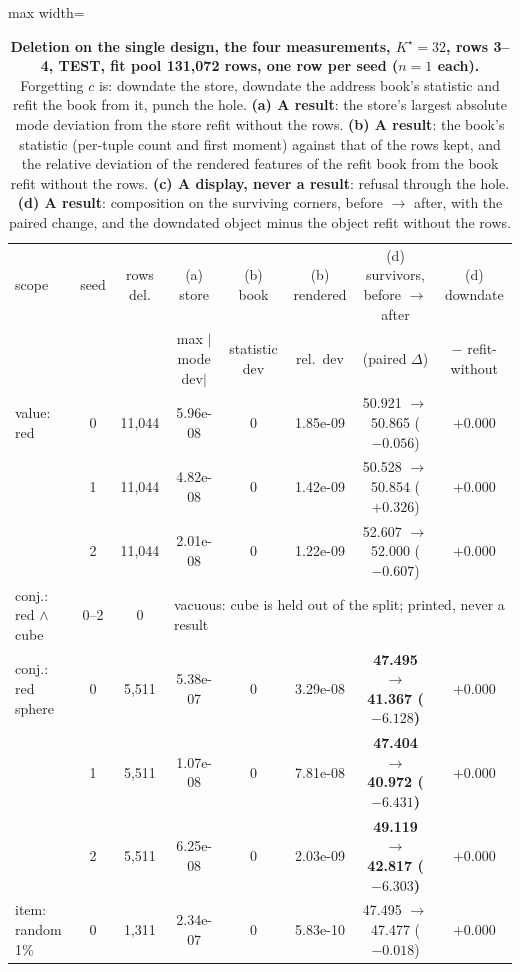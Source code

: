 \documentclass{article} %
\newcommand{\Kstar}{\ensuremath{K^{\star}}}
\begin{document}
\begin{table}[t]
\centering\small
\caption{\textbf{Deletion on the single design, the four measurements, $\Kstar=32$, rows 3--4, TEST, fit %
pool 131,072 rows, one row per seed ($n=1$ each).} Forgetting $c$ is: downdate the store, downdate %
the address book's statistic and refit the book from it, punch the hole. \textbf{(a) A result}: the
store's largest absolute mode deviation from the store refit without the rows. \textbf{(b) A
result}: the book's statistic (per-tuple count and first moment) against that of the rows kept, and
the relative deviation of the rendered features of the refit book from the book refit without the
rows. \textbf{(c) A display, never a result}: refusal through the hole. \textbf{(d) A result}:
composition on the surviving corners, before $\to$ after, with the paired change, and the downdated
object minus the object refit without the rows.}
\label{tab:del}
\setlength{\tabcolsep}{2.6pt}
\begin{adjustbox}{max width=\linewidth}\begin{tabular}{lccccccc}
\toprule
scope & seed & rows del. & (a) store & (b) book & (b) rendered & (d) survivors, before $\to$ after & (d) downdate \\
 & & & max $|$mode dev$|$ & statistic dev & rel.\ dev & (paired $\Delta$) & $-$ refit-without \\
\midrule
value: red & 0 & 11,044 & 5.96e-08 & 0 & 1.85e-09 & 50.921 $\to$ 50.865 ($-0.056$) & $+0.000$ \\
 & 1 & 11,044 & 4.82e-08 & 0 & 1.42e-09 & 50.528 $\to$ 50.854 ($+0.326$) & $+0.000$ \\
 & 2 & 11,044 & 2.01e-08 & 0 & 1.22e-09 & 52.607 $\to$ 52.000 ($-0.607$) & $+0.000$ \\
conj.: red $\wedge$ cube & 0--2 & 0 & \multicolumn{5}{l}{vacuous: cube is held out of the split; printed, never a result} \\
conj.: red sphere & 0 & 5,511 & 5.38e-07 & 0 & 3.29e-08 & \textbf{47.495 $\to$ 41.367 ($-6.128$)} & $+0.000$ \\
 & 1 & 5,511 & 1.07e-08 & 0 & 7.81e-08 & \textbf{47.404 $\to$ 40.972 ($-6.431$)} & $+0.000$ \\
 & 2 & 5,511 & 6.25e-08 & 0 & 2.03e-09 & \textbf{49.119 $\to$ 42.817 ($-6.303$)} & $+0.000$ \\
item: random 1\% & 0 & 1,311 & 2.34e-07 & 0 & 5.83e-10 & 47.495 $\to$ 47.477 ($-0.018$) & $+0.000$ \\

\end{tabular}
\end{adjustbox}
\end{table}
\end{document}
